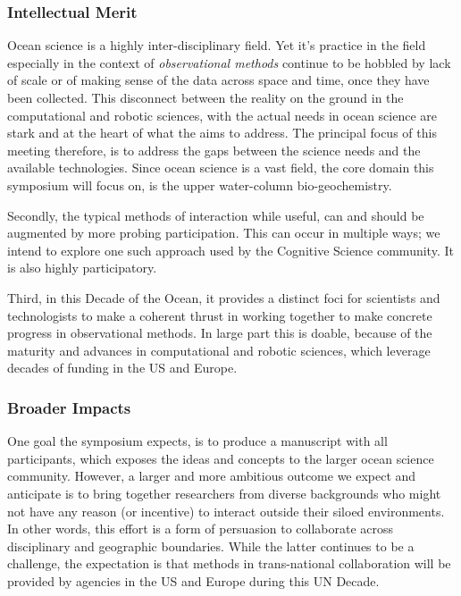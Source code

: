 

\subsubsection{Intellectual Merit}

Ocean science is a highly inter-disciplinary field. Yet it's practice in
the field especially in the context of \emph{observational methods}
continue to be hobbled by lack of scale or of making sense of the data
across space and time, once they have been collected. This disconnect
between the reality on the ground in the computational and robotic
sciences, with the actual needs in ocean science are stark and at the
heart of what the \symp aims to address. The principal focus of this
meeting therefore, is to address the gaps between the science needs and
the available technologies. Since ocean science is a vast field, the
core domain this symposium will focus on, is the upper water-column
bio-geochemistry.

Secondly, the typical methods of interaction while useful, can and
should be augmented by more probing participation. This can occur in
multiple ways; we intend to explore one such approach used by the
Cognitive Science community. It is also highly participatory.

Third, in this Decade of the Ocean, it provides a distinct foci for
scientists and technologists to make a coherent thrust in working
together to make concrete progress in observational methods. In large
part this is doable, because of the maturity and advances in
computational and robotic sciences, which leverage decades of funding in
the US and Europe.

\subsubsection{Broader Impacts}

One goal the symposium expects, is to produce a manuscript with all
participants, which exposes the ideas and concepts to the larger ocean
science community. However, a larger and more ambitious outcome we
expect and anticipate is to bring together researchers from diverse
backgrounds who might not have any reason (or incentive) to interact
outside their siloed environments. In other words, this effort is a form
of persuasion to collaborate across disciplinary and geographic
boundaries. While the latter continues to be a challenge, the
expectation is that methods in trans-national collaboration will be
provided by agencies in the US and Europe during this UN Decade.

